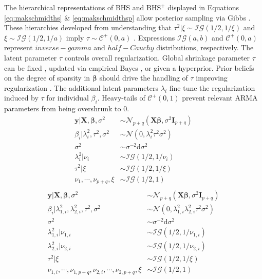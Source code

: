 The hierarchical representations of BHS and $\textrm{BHS}^+$ displayed in Equations \ref{eq:makschmidths} \& \ref{eq:makschmidthsp} allow posterior sampling via Gibbs \citep{Makalic2016b}. These hierarchies developed from understanding that $\tau^2|\xi \sim \mathcal{IG}(1/2,1/\xi)$ and $\xi\sim\mathcal{IG}(1/2,1/a)$ imply $\tau\sim\mathcal{C}^+(0,a)$ \citep{Wand2011}. Expressions $\mathcal{IG}(a,b)$ and $\mathcal{C}^+(0,a)$ represent $inverse-gamma$ and $half-Cauchy$ distributions, respectively. The latent parameter $\tau$ controls overall regularization. Global shrinkage parameter $\tau$ can be fixed \citep{vanderPas2014}, updated via empirical Bayes \citep{Johnstone2004}, or given a hyperprior\citep{Carvalho2009,Carvalho2010}. Prior beliefs on the degree of sparsity in $\bm{\beta}$  should drive the handling of $\tau$ improving regularization \citep{vanderPas2014,Piironen2016}. The additional latent parameters $\lambda_i$ fine tune the regularization induced by $\tau$ for individual $\beta_i$. Heavy-tails of $\mathcal{C}^+(0,1)$ prevent relevant ARMA parameters from being overshrunk to 0.
\begin{equation}
\label{eq:makschmidths}
\begin{split}
\bm{y}|\bm{X},\bm{\beta},\sigma^2 & \sim \mathcal{N}_{p+q}(\bm{X}\bm{\beta},\sigma^2\bm{I}_{p+q}) \\
\beta_i|\lambda^2_i,\tau^2,\sigma^2 & \sim \mathcal{N}(0,\lambda^2_i\tau^2\sigma^2) \\
\sigma^2 & \sim \sigma^{-2}\textrm{d}\sigma^2 \\
\lambda^2_i|\nu_i & \sim \mathcal{IG}(1/2,1/\nu_i)\\
\tau^2|\xi & \sim \mathcal{IG}(1/2,1/\xi)\\
\nu_1,\cdots, \nu_{p+q},\xi & \sim \mathcal{IG}(1/2,1) \\
\end{split}
\end{equation}
\begin{equation}
\label{eq:makschmidthsp}
\begin{split}
\bm{y}|\bm{X},\bm{\beta},\sigma^2 & \sim \mathcal{N}_{p+q}(\bm{X}\bm{\beta},\sigma^2\bm{I}_{p+q}) \\
\beta_i|\lambda^2_{1,i},\lambda^2_{2,i},\tau^2,\sigma^2 & \sim \mathcal{N}(0,\lambda^2_{1,i}\lambda^2_{2,i}\tau^2\sigma^2) \\
\sigma^2 & \sim \sigma^{-2}\textrm{d}\sigma^2 \\
\lambda^2_{1,i}|\nu_{1,i} & \sim \mathcal{IG}(1/2,1/\nu_{1,i})\\
\lambda^2_{2,i}|\nu_{2,i} & \sim \mathcal{IG}(1/2,1/\nu_{2,i})\\
\tau^2|\xi & \sim \mathcal{IG}(1/2,1/\xi)\\
\nu_{1,i},\cdots, \nu_{1,p+q},\nu_{2,i},\cdots, \nu_{2,p+q},\xi & \sim \mathcal{IG}(1/2,1) \\
\end{split}
\end{equation}

